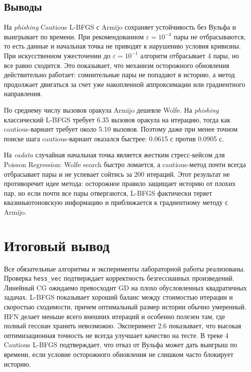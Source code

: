 \documentclass[a4paper,12pt]{article}
\begin{document}
\subsection*{Выводы}
На \textit{phishing} Cautious L-BFGS с Armijo сохраняет устойчивость без Вульфа и выигрывает по времени. При рекомендованном $\varepsilon=10^{-4}$ пары не отбрасываются, то есть данные и начальная точка не приводят к нарушению условия кривизны. При искусственном ужесточении до $\varepsilon=10^{-1}$ алгоритм отбрасывает 4 пары, но все равно сходится. Это показывает, что механизм осторожного обновления действительно работает: сомнительные пары не попадают в историю, а метод продолжает двигаться за счет уже накопленной аппроксимации или градиентного направления.

По среднему числу вызовов оракула Armijo дешевле Wolfe. На \textit{phishing} классический L-BFGS требует 6.35 вызовов оракула на итерацию, тогда как cautious-вариант требует около 5.10 вызовов. Поэтому даже при менее точном поиске шага cautious-вариант оказался быстрее: 0.0615 с против 0.0905 с.

На \textit{cadata} случайная начальная точка является жестким стресс-кейсом для Poisson Regression: Wolfe search быстро ломается, а cautious-метод почти всегда отбрасывает пары и не успевает сойтись за 200 итераций. Этот результат не противоречит идее метода: осторожное правило защищает историю от плохих пар, но если почти все пары отвергаются, L-BFGS фактически теряет квазиньютоновскую информацию и приближается к градиентному методу с Armijo.

\section*{Итоговый вывод}
Все обязательные алгоритмы и эксперименты лабораторной работы реализованы. Проверка \texttt{hess\_vec} подтверждает корректность безгессианных произведений. Линейный CG ожидаемо превосходит GD на плохо обусловленных квадратичных задачах. L-BFGS показывает хороший баланс между стоимостью итерации и скоростью сходимости, причем оптимальный размер истории обычно умеренный. HFN делает меньше всего внешних итераций и особенно полезен там, где полный гессиан хранить невозможно. Эксперимент 2.6 показывает, что высокая оптимизационная точность не всегда улучшает качество на тесте. В треке 4 Cautious L-BFGS подтверждает, что отказ от Вульфа может дать выигрыш по времени, если условие осторожного обновления не слишком часто блокирует историю.
\end{document}

